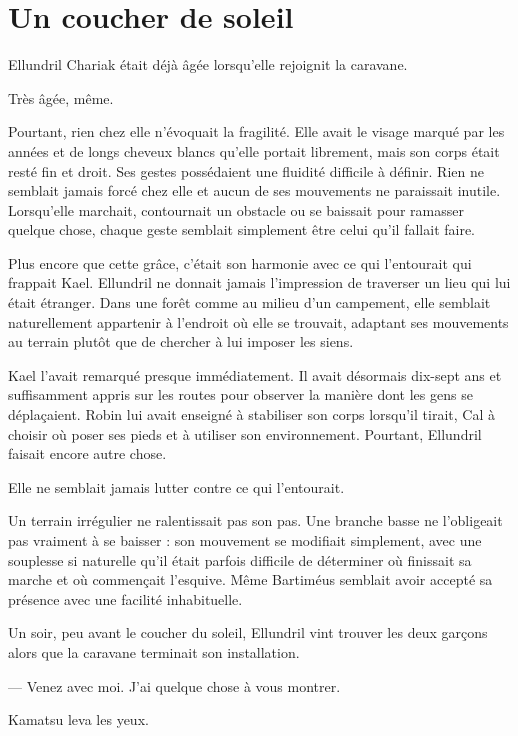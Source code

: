 \chapter{Un coucher de soleil}
\label{chap:un-coucher-de-soleil}

Ellundril Chariak était déjà âgée lorsqu'elle rejoignit la caravane.

Très âgée, même.

Pourtant, rien chez elle n'évoquait la fragilité. Elle avait le visage marqué
par les années et de longs cheveux blancs qu'elle portait librement, mais son
corps était resté fin et droit. Ses gestes possédaient une fluidité difficile
à définir. Rien ne semblait jamais forcé chez elle et aucun de ses mouvements
ne paraissait inutile. Lorsqu'elle marchait, contournait un obstacle ou se
baissait pour ramasser quelque chose, chaque geste semblait simplement être
celui qu'il fallait faire.

Plus encore que cette grâce, c'était son harmonie avec ce qui l'entourait qui
frappait Kael. Ellundril ne donnait jamais l'impression de traverser un lieu
qui lui était étranger. Dans une forêt comme au milieu d'un campement, elle
semblait naturellement appartenir à l'endroit où elle se trouvait, adaptant
ses mouvements au terrain plutôt que de chercher à lui imposer les siens.

Kael l'avait remarqué presque immédiatement. Il avait désormais dix-sept ans et
suffisamment appris sur les routes pour observer la manière dont les gens se
déplaçaient. Robin lui avait enseigné à stabiliser son corps lorsqu'il tirait,
Cal à choisir où poser ses pieds et à utiliser son environnement. Pourtant,
Ellundril faisait encore autre chose.

Elle ne semblait jamais lutter contre ce qui l'entourait.

Un terrain irrégulier ne ralentissait pas son pas. Une branche basse ne
l'obligeait pas vraiment à se baisser : son mouvement se modifiait simplement,
avec une souplesse si naturelle qu'il était parfois difficile de déterminer où
finissait sa marche et où commençait l'esquive. Même Bartiméus semblait avoir
accepté sa présence avec une facilité inhabituelle.

Un soir, peu avant le coucher du soleil, Ellundril vint trouver les deux
garçons alors que la caravane terminait son installation.

— Venez avec moi. J'ai quelque chose à vous montrer.

Kamatsu leva les yeux.

